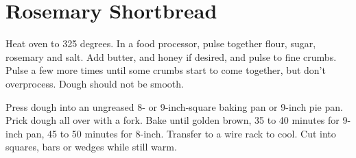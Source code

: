 \section{Rosemary Shortbread}
\begin{recipe}



	Heat oven to 325 degrees. In a food processor, pulse together flour, sugar, rosemary and salt. Add butter, and honey if desired, and pulse to fine crumbs. Pulse a few more times until some crumbs start to come together, but don't overprocess. Dough should not be smooth.

	Press dough into an ungreased 8- or 9-inch-square baking pan or 9-inch pie pan. Prick dough all over with a fork. Bake until golden brown, 35 to 40 minutes for 9-inch pan, 45 to 50 minutes for 8-inch. Transfer to a wire rack to cool. Cut into squares, bars or wedges while still warm.
\end{recipe}
